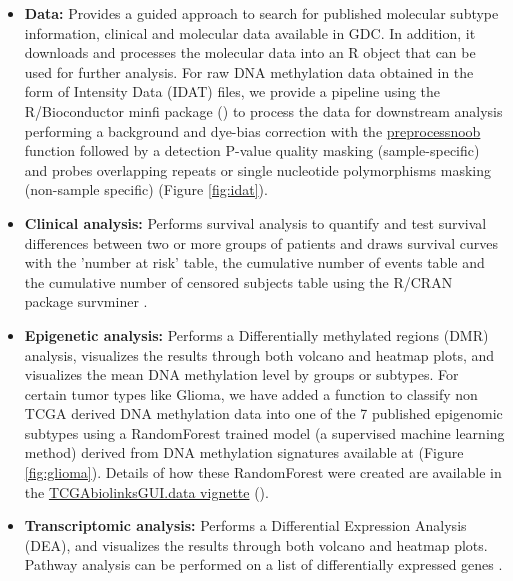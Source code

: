 \begin{itemize}
	\item \textbf{Data:} Provides a guided approach to search for published molecular subtype information, clinical and molecular data available in GDC. In addition, it downloads and processes the molecular data into an R object that can be used for further analysis. For raw DNA methylation data obtained in the form of Intensity Data (IDAT) files, we provide a pipeline using the R/Bioconductor minfi package () to process the data for downstream analysis \cite{aryee2014minfi} performing a background and dye-bias correction with the \href{https://www.bioconductor.org/help/course-materials/2015/BioC2015/methylation450k.html\#preprocessnoob}{preprocessnoob} function followed by a detection P-value quality masking (sample-specific) \cite{morris2015analysis} and probes overlapping repeats or single nucleotide polymorphisms masking (non-sample specific) \cite{zhou2016comprehensive} (Figure \ref{fig:idat}).
	\item \textbf{Clinical analysis:} Performs survival analysis to quantify and test survival differences between two or more groups of patients and draws survival curves with the 'number at risk' table, the cumulative number of events table and the cumulative number of censored subjects table using the R/CRAN package survminer \cite{survminer}.
	\item \textbf{Epigenetic analysis:} Performs a Differentially methylated regions (DMR) analysis, visualizes the results through both volcano and heatmap plots, and visualizes the mean DNA methylation level by groups or subtypes. For certain tumor types like Glioma, we have added a function to classify non TCGA derived DNA methylation data into one of the 7 published epigenomic subtypes \cite{ceccarelli2016molecular} using a RandomForest trained model (a supervised machine learning method) derived from DNA methylation signatures available at  (Figure \ref{fig:glioma}). Details of how these RandomForest were created are available in the \href{https://bioconductor.org/packages/devel/data/experiment/vignettes/TCGAbiolinksGUI.data/inst/doc/vignettes.html}{TCGAbiolinksGUI.data vignette} ().
	\item \textbf{Transcriptomic analysis:} Performs a Differential Expression Analysis (DEA), and visualizes the results through both volcano and heatmap plots. Pathway analysis can be performed on a list of differentially expressed genes \cite{luo2013pathview}.

\end{itemize}
